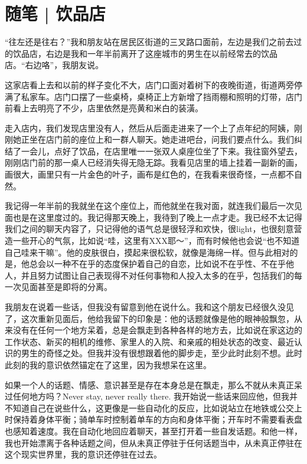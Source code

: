 \chapter{随笔 | 饮品店}



“往左还是往右？”我和朋友站在居民区街道的三叉路口面前，左边是我们之前去过的饮品店，右边是我和一年半前离开了这座城市的男生在以前经常去的饮品店。“右边咯”，我朋友说。

这家店看上去和以前的样子变化不大，店门口面对着树下的夜晚街道，街道两旁停满了私家车。店门口摆了一些桌椅，桌椅正上方新增了挡雨棚和照明的灯带，店门前看上去明亮了不少，店里依然是亮黄和米白的装潢。

走入店内，我们发现店里没有人，然后从后面走进来了一个上了点年纪的阿姨，刚刚她正坐在店门前的座位上和一群人聊天。她走进吧台，问我们要点什么。我们纠结了一会儿，点好了饮品，在店里唯一一张双人桌座位坐了下来。我往窗外望去，刚刚店门前的那一桌人已经消失得无隐无踪。我看见店里的墙上挂着一副新的画，画很大，画里只有一片金色的叶子，画布是红色的，在我看来很奇怪，一点都不自然。

我记得一年半前的我就坐在这个座位上，而他就坐在我对面，就连我们最后一次见面也是在这里度过的。我记得那天晚上，我待到了晚上一点才走。我已经不太记得我们之间的聊天内容了，只记得他的语气总是很轻浮和欢快，很light，也很刻意营造一些开心的气氛，比如说“哇，这里有XXX耶～”，而有时候他也会说“也不知道自己哇来干嘛”。他的皮肤很白，摸起来很松软，就像是海绵一样。但与此相对的是，他总会以一种不在乎的态度保护着自己的自恋，比如说不在乎性、不在乎他人，并且努力试图让自己表现得不对任何事物和人投入太多的在乎，包括我们的每一次见面甚至是即将的分离。

我朋友在说着一些话，但我没有留意到他在说什么。我和这个朋友已经很久没见了，这次重新见面后，他给我留下的印象是：他的话题就像是他的眼神般飘忽，从来没有在任何一个地方呆着，总是会飘走到各种各样的地方去，比如说在家这边的工作状态、新买的相机的维修、家里人的入院、和亲戚的相处状态的改变、最近认识的男生的奇怪之处。但我并没有很想跟着他的脚步走，至少此时此刻不想。此时此刻的我的意识依然锚定在了这里，因为我想呆在这里。

如果一个人的话题、情感、意识甚至是存在本身总是在飘走，那么不就从未真正呆过任何地方吗？Never stay, never really there. 我开始说一些话来回应他，但我并不知道自己在说些什么，这更像是一些自动化的反应，比如说站立在地铁或公交上时保持着身体平衡；骑单车时控制着单车的方向和身体平衡；开车时不需要看表盘也感知着速度。我在自动化地回应着聊天，甚至打开着一些自发话题。和他一样，我也开始漂离于各种话题之间，但从未真正停驻于任何话题当中，从未真正停驻在这个现实世界里，我的意识还停驻在过去。

